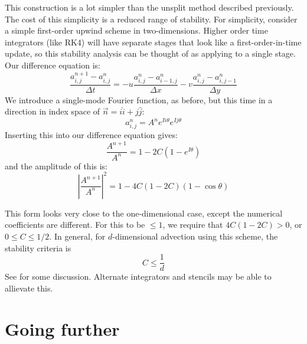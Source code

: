 This construction is a lot simpler than the unsplit method described
previously.  The cost of this simplicity is a reduced range of
stability.  For simplicity, consider a simple first-order upwind
scheme in two-dimensions.  Higher order time integrators (like RK4)
will have separate stages that look like a first-order-in-time update,
so this stability analysis can be thought of as applying to a single
stage.  Our difference equation is:
\begin{equation}
\frac{a^{n+1}_{i,j} - a^n_{i,j}}{\Delta t} = - u \frac{a^n_{i,j} - a^n_{i-1,j}}{\Delta x}
- v \frac{a^n_{i,j} - a^n_{i,j-1}}{\Delta y}
\end{equation}
We introduce a single-mode Fourier function, as before, but this time
in a direction in index space of $\vec{n} = i \hat{i} + j \hat{j}$:
\begin{equation}
a^n_{i,j} = A^n e^{Ii\theta}e^{Ij\theta}
\end{equation}
Inserting this into our difference equation gives:
\begin{equation}
\frac{A^{n+1}}{A^n} = 1 - 2C \left (1 - e^{I\theta} \right )
\end{equation}
and the amplitude of this is:
\begin{equation}
\left | \frac{A^{n+1}}{A^n} \right |^2 = 1 - 4C(1-2C)(1-\cos\theta)
\end{equation}

This form looks very close to the one-dimensional case, except the
numerical coefficients are different.  For this to be $\le 1$, we
require that $4C(1-2C) > 0$, or $0 \le C \le 1/2$.  In general, for
$d$-dimensional advection using this scheme, the stability criteria is
\begin{equation}
C \le \frac{1}{d}
\end{equation}
See \cite{titarevtoro} for some discussion.  Alternate integrators and
stencils may be able to allievate this.

\section{Going further}

